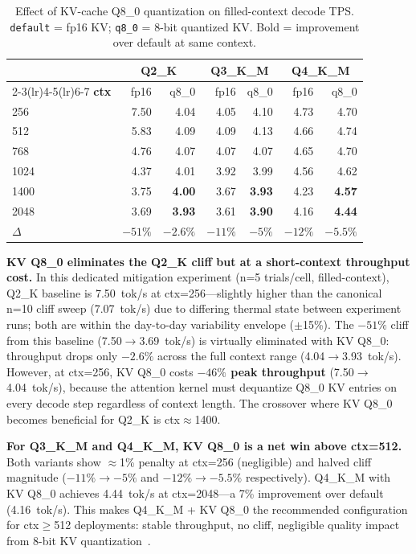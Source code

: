 \documentclass[conference]{IEEEtran}
\begin{document}
\begin{table}[h]
\centering
\caption{Effect of KV-cache Q8\_0 quantization on filled-context decode TPS.
\texttt{default} = fp16 KV; \texttt{q8\_0} = 8-bit quantized KV.
Bold = improvement over default at same context.}
\label{tab:kvcache_quant}
\setlength{\tabcolsep}{3pt}
\footnotesize
\begin{tabular}{@{}lrrrrrr@{}}
\toprule
& \multicolumn{2}{c}{\textbf{Q2\_K}} & \multicolumn{2}{c}{\textbf{Q3\_K\_M}} & \multicolumn{2}{c}{\textbf{Q4\_K\_M}} \\
\cmidrule(lr){2-3}\cmidrule(lr){4-5}\cmidrule(lr){6-7}
\textbf{ctx} & fp16 & q8\_0 & fp16 & q8\_0 & fp16 & q8\_0 \\
\midrule
256  & 7.50 & 4.04 & 4.05 & 4.10 & 4.73 & 4.70 \\
512  & 5.83 & 4.09 & 4.09 & 4.13 & 4.66 & 4.74 \\
768  & 4.76 & 4.07 & 4.07 & 4.07 & 4.65 & 4.70 \\
1024 & 4.37 & 4.01 & 3.92 & 3.99 & 4.56 & 4.62 \\
1400 & 3.75 & \textbf{4.00} & 3.67 & \textbf{3.93} & 4.23 & \textbf{4.57} \\
2048 & 3.69 & \textbf{3.93} & 3.61 & \textbf{3.90} & 4.16 & \textbf{4.44} \\
\midrule
$\Delta$ & $-51\%$ & $-2.6\%$ & $-11\%$ & $-5\%$ & $-12\%$ & $-5.5\%$ \\
\bottomrule
\end{tabular}
\end{table}

\textbf{KV Q8\_0 eliminates the Q2\_K cliff but at a short-context throughput cost.}
In this dedicated mitigation experiment (n=5 trials/cell, filled-context),
Q2\_K baseline is 7.50~tok/s at ctx=256---slightly higher than the canonical
n=10 cliff sweep (7.07~tok/s) due to differing thermal state between experiment
runs; both are within the day-to-day variability envelope ($\pm$15\%).
The $-51\%$ cliff from this baseline (7.50$\to$3.69~tok/s) is virtually eliminated
with KV Q8\_0: throughput drops only $-2.6\%$ across the full context range
(4.04$\to$3.93~tok/s).
However, at ctx=256, KV Q8\_0 costs \textbf{$-46\%$ peak throughput}
(7.50$\to$4.04~tok/s), because the attention kernel must dequantize Q8\_0 KV entries
on every decode step regardless of context length.
The crossover where KV Q8\_0 becomes beneficial for Q2\_K is ctx$\approx$1400.

\textbf{For Q3\_K\_M and Q4\_K\_M, KV Q8\_0 is a net win above ctx=512.}
Both variants show $\approx$1\% penalty at ctx=256 (negligible) and
halved cliff magnitude ($-11\%\to-5\%$ and $-12\%\to-5.5\%$ respectively).
Q4\_K\_M with KV Q8\_0 achieves 4.44~tok/s at ctx=2048---a 7\% improvement over
default (4.16~tok/s).
This makes Q4\_K\_M + KV Q8\_0 the recommended configuration for
ctx$\geq$512 deployments: stable throughput, no cliff, negligible quality impact
from 8-bit KV quantization~\cite{kvquant}.
\end{document}
